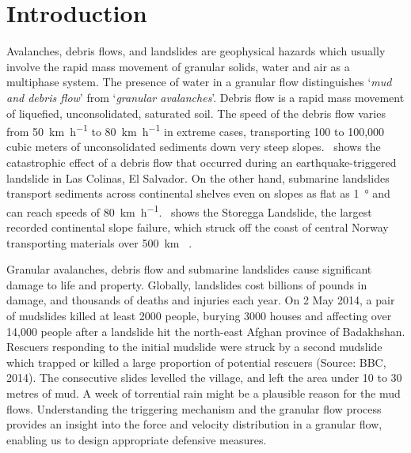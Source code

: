 \chapter{Introduction}

\ifpdf
    \graphicspath{{Chapter1/figs/raster/}{Chapter1/figs/pdf/}{Chapter1/figs/}}
\else
    \graphicspath{{Chapter1/figs/vector/}{Chapter1/figs/}}
\fi

Avalanches, debris flows, and landslides are geophysical hazards which usually 
involve the rapid mass movement of granular solids, water and air as a 
multiphase system.
The presence of water in a granular flow distinguishes `\textit{mud and debris 
flow}' from `\textit{granular avalanches}'. Debris flow is a rapid mass 
movement of liquefied, unconsolidated, saturated soil. The speed of the debris 
flow varies from \SI{50}{\km\per\hour} to \SI{80}{\km\per\hour} in extreme 
cases, transporting 100 to 100,000 cubic meters of unconsolidated sediments 
down very 
steep slopes.~ shows the catastrophic effect of a debris flow 
that occurred during an earthquake-triggered landslide in Las Colinas,  El 
Salvador. On the other hand, submarine landslides transport sediments across 
continental shelves even on slopes as flat as \SI{1}{\degree} and can reach 
speeds of \SI{80}{\km\per\hour}.~ shows the Storegga 
Landslide, the largest recorded continental slope failure, which struck off the 
coast of central Norway transporting materials over \SI{500}{\km} 
~\citep{Ward2002}. 

Granular avalanches, debris flow and submarine landslides cause significant 
damage to life and property. Globally, landslides cost billions of pounds in 
damage, and thousands of deaths and injuries each year. On 2 May 2014, a pair 
of mudslides killed at least 2000 people, burying 3000 houses and affecting 
over 14,000 people after a landslide hit the north-east Afghan province of 
Badakhshan. Rescuers responding to the initial mudslide were struck by a second 
mudslide which trapped or killed a large proportion of potential rescuers 
(Source: BBC, 2014). The consecutive slides levelled the village, and left the 
area under 10 to 30 metres of mud. A week of torrential rain might be a 
plausible reason for the mud flows. Understanding the triggering mechanism and 
the granular flow process provides an insight into the force and velocity 
distribution in a granular flow, enabling us to design appropriate defensive 
measures. 

